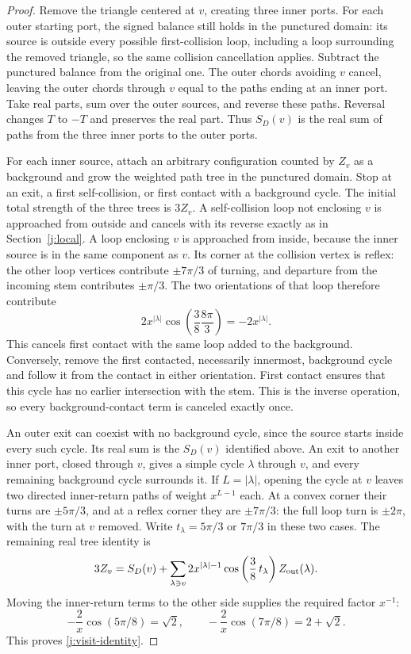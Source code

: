 \begin{proof}
Remove the triangle centered at $v$, creating three inner ports. For
each outer starting port, the signed balance still holds in the
punctured domain: its source is outside every possible first-collision
loop, including a loop surrounding the removed triangle, so the same
collision cancellation applies. Subtract the punctured balance from
the original one. The outer chords avoiding $v$ cancel, leaving the
outer chords through $v$ equal to the paths ending at an inner port.
Take real parts, sum over the outer sources, and reverse these paths.
Reversal changes $T$ to $-T$ and preserves the real part. Thus $S_D(v)$
is the real sum of paths from the three inner ports to the outer ports.

For each inner source, attach an arbitrary configuration counted by
$Z_v$ as a background and grow the weighted path tree in the punctured
domain. Stop at an exit, a first self-collision, or first contact with a
background cycle. The initial total strength of the three trees is
$3Z_v$. A self-collision loop not enclosing $v$ is approached from
outside and cancels with its reverse exactly as in
Section~\ref{j:local}. A loop enclosing $v$ is approached from inside,
because the inner source is in the same component as $v$. Its corner at
the collision vertex is reflex: the other loop vertices contribute
$\pm7\pi/3$ of turning, and departure from the incoming stem contributes
$\pm\pi/3$. The two orientations of that loop therefore contribute
\[
 2x^{|\lambda|}
 \cos\left(\frac38\frac{8\pi}{3}\right)=-2x^{|\lambda|}.
\]
This cancels first contact with the same loop added to the background.
Conversely, remove the first contacted, necessarily innermost,
background cycle and follow it from the contact in either orientation.
First contact ensures that this cycle has no earlier intersection with
the stem. This is the inverse operation, so every background-contact
term is canceled exactly once.

An outer exit can coexist with no background cycle, since the source
starts inside every such cycle. Its real sum is the $S_D(v)$ identified
above. An exit to another inner port, closed through $v$, gives a simple
cycle $\lambda$ through $v$, and every remaining background cycle
surrounds it. If $L=|\lambda|$, opening the cycle at $v$ leaves two
directed inner-return paths of weight $x^{L-1}$ each. At a convex corner
their turns are $\pm5\pi/3$, and at a reflex corner they are
$\pm7\pi/3$: the full loop turn is $\pm2\pi$, with the turn at $v$
removed. Write $t_\lambda=5\pi/3$ or $7\pi/3$ in these two cases.
The remaining real tree identity is
\[
 3Z_v=S_D(v)+
 \sum_{\lambda\ni v}2x^{|\lambda|-1}
 \cos\left(\frac38\,t_\lambda\right)Z_{\rm out}(\lambda).
\]
Moving the inner-return terms to the other side supplies the required
factor $x^{-1}$:
\[
 -\frac2x\cos(5\pi/8)=\sqrt2,\qquad
 -\frac2x\cos(7\pi/8)=2+\sqrt2.
\]
This proves \eqref{j:visit-identity}.


\end{proof}
